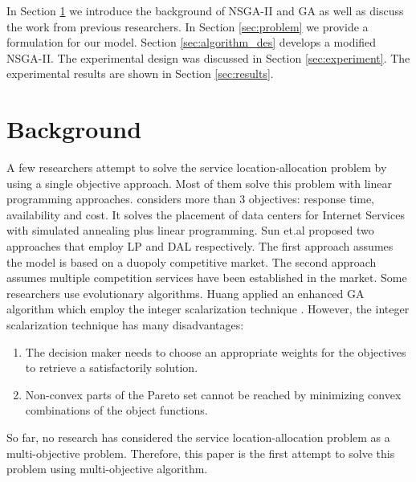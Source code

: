 \documentclass{llncs}
\begin{document}
In Section \ref{sec:Background} we introduce the background of NSGA-II and GA as well as discuss the work from previous researchers.
In Section \ref{sec:problem} we provide a formulation for our model. Section \ref{sec:algorithm_des} develops a modified NSGA-II. 
The experimental design was discussed in Section \ref{sec:experiment}. The experimental results are shown in Section \ref{sec:results}.


\section{Background}
\label{sec:Background}
A few researchers attempt to solve the service location-allocation problem by using a single objective approach. Most of them solve this problem with linear programming approaches.
\cite{5961695} considers more than 3 objectives: response time, availability and cost. 
It solves the placement of data centers for Internet Services with simulated annealing plus linear programming. 
Sun et.al proposed two approaches \cite{Aboolian} \cite{Sun} that employ LP and DAL respectively. 
The first approach \cite{Aboolian} assumes the model is based on a duopoly competitive market.
The second approach \cite{Sun} assumes multiple competition services have been established in the market.
Some researchers use evolutionary algorithms. Huang \cite{EnhancedGenetic} applied an enhanced GA algorithm which employ the integer scalarization technique \cite{Multiobjective}. However, 
the integer scalarization technique has many disadvantages:
\begin{enumerate}
	\item The decision maker needs to choose an appropriate weights for the objectives to retrieve a satisfactorily solution.
	\item Non-convex parts of the Pareto set cannot be reached by minimizing convex combinations of the object functions.
\end{enumerate}

So far, no research has considered the service location-allocation problem as a multi-objective problem. Therefore, this paper is the first attempt to solve this problem using 
multi-objective algorithm.
\end{document}
